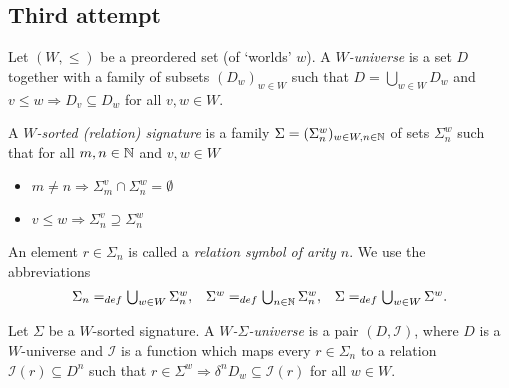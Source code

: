 \documentclass[12pt,a4paper]{report}
\begin{document}

\pagebreak
\subsection{Third attempt}

\newcommand{\CExp}{\nstyle{CExp}}
\newcommand{\CVal}{\nstyle{CVal}}
\newcommand{\loc}{\nstyle{loc}}
\newcommand{\sto}{\nstyle{sto}}
\newcommand{\val}{\nstyle{val}}
\newcommand{\DEF}{\nstyle{DEF}}
\newcommand{\OUT}{\nstyle{OUT}}
\newcommand{\I}{\mathcal{I}}

\begin{definition}
  Let $(W,\le)$ be a preordered set (of `worlds' $w$).
  A {\em $W$-universe} is a set $D$ together with a family of subsets $(D_w)_{w\in W}$ such that
  $D = \bigcup_{w\in W} D_w$ and $v \le w \Rightarrow D_v \subseteq D_w$ for all $v,w \in W$.
\end{definition}

\begin{definition}
  A {\em $W$-sorted (relation) signature} is a family $\Sigma=(\Sigma^w_n)_{w\in W,n\in \mathbb N}$
  of sets $\Sigma^w_n$ such that for all $m,n\in \mathbb N$ and $v,w\in W$
  \begin{itemize}
    \item $m \ne n \Rightarrow \Sigma^v_m \cap \Sigma^w_n = \emptyset$
    \item $v \le w \Rightarrow \Sigma^v_n \supseteq \Sigma^w_n$
  \end{itemize}
\end{definition}

An element $r \in \Sigma_n$ is called a {\em relation symbol of arity $n$}. We use the abbreviations
\[\begin{array}{rcl}
  \Sigma_n =_{def} \bigcup_{w\in W} \Sigma^w_n, &
  \Sigma^w =_{def} \bigcup_{n\in \mathbb N} \Sigma^w_n, &
  \Sigma =_{def} \bigcup_{w\in W} \Sigma^w.
\end{array}\]

\begin{definition}
  Let $\Sigma$ be a $W$-sorted signature. A {\em $W$-$\Sigma$-universe} is a pair
  $(D,\I)$, where $D$ is a $W$-universe and $\I$ is a function which maps every
  $r \in \Sigma_n$ to a relation $\I(r) \subseteq D^n$ such that
  $r \in \Sigma^w \Rightarrow \delta^n D_w \subseteq \I(r)$ for all $w \in W$.
\end{definition}
\end{document}
